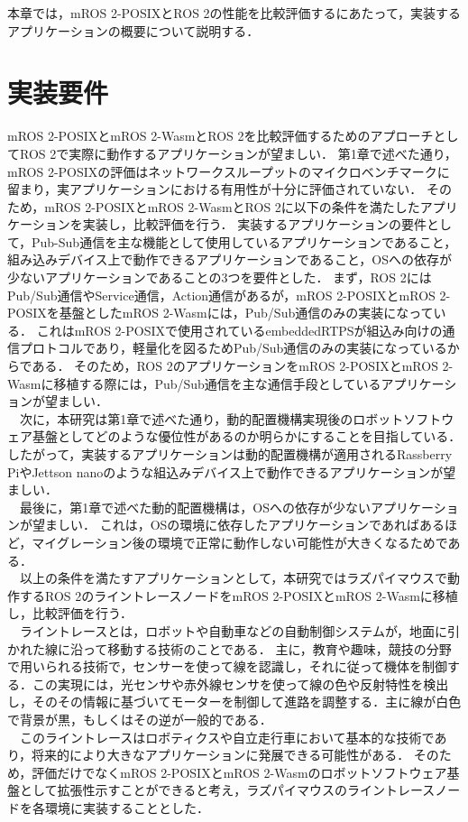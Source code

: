 \noindent 本章では，mROS 2-POSIXとROS 2の性能を比較評価するにあたって，実装するアプリケーションの概要について説明する．
\section{実装要件}
mROS 2-POSIXとmROS 2-WasmとROS 2を比較評価するためのアプローチとしてROS 2で実際に動作するアプリケーションが望ましい．
第1章で述べた通り，mROS 2-POSIXの評価はネットワークスループットのマイクロベンチマークに留まり，実アプリケーションにおける有用性が十分に評価されていない．
そのため，mROS 2-POSIXとmROS 2-WasmとROS 2に以下の条件を満たしたアプリケーションを実装し，比較評価を行う．
実装するアプリケーションの要件として，Pub-Sub通信を主な機能として使用しているアプリケーションであること，組み込みデバイス上で動作できるアプリケーションであること，OSへの依存が少ないアプリケーションであることの3つを要件とした．
まず，ROS 2にはPub/Sub通信やService通信，Action通信があるが，mROS 2-POSIXとmROS 2-POSIXを基盤としたmROS 2-Wasmには，Pub/Sub通信のみの実装になっている．
これはmROS 2-POSIXで使用されているembeddedRTPSが組込み向けの通信プロトコルであり，軽量化を図るためPub/Sub通信のみの実装になっているからである．
そのため，ROS 2のアプリケーションをmROS 2-POSIXとmROS 2-Wasmに移植する際には，Pub/Sub通信を主な通信手段としているアプリケーションが望ましい．
\\　次に，本研究は第1章で述べた通り，動的配置機構実現後のロボットソフトウェア基盤としてどのような優位性があるのか明らかにすることを目指している．
したがって，実装するアプリケーションは動的配置機構が適用されるRassberry PiやJettson nanoのような組込みデバイス上で動作できるアプリケーションが望ましい．
\\　最後に，第1章で述べた動的配置機構は，OSへの依存が少ないアプリケーションが望ましい．
これは，OSの環境に依存したアプリケーションであればあるほど，マイグレーション後の環境で正常に動作しない可能性が大きくなるためである．
\\　以上の条件を満たすアプリケーションとして，本研究ではラズパイマウスで動作するROS 2のライントレースノードをmROS 2-POSIXとmROS 2-Wasmに移植し，比較評価を行う．
\\　ライントレースとは，ロボットや自動車などの自動制御システムが，地面に引かれた線に沿って移動する技術のことである．
主に，教育や趣味，競技の分野で用いられる技術で，センサーを使って線を認識し，それに従って機体を制御する．この実現には，光センサや赤外線センサを使って線の色や反射特性を検出し，そのその情報に基づいてモーターを制御して進路を調整する．主に線が白色で背景が黒，もしくはその逆が一般的である．
\\　このライントレースはロボティクスや自立走行車において基本的な技術であり，将来的により大きなアプリケーションに発展できる可能性がある．
そのため，評価だけでなくmROS 2-POSIXとmROS 2-Wasmのロボットソフトウェア基盤として拡張性示すことができると考え，ラズパイマウスのライントレースノードを各環境に実装することとした．
